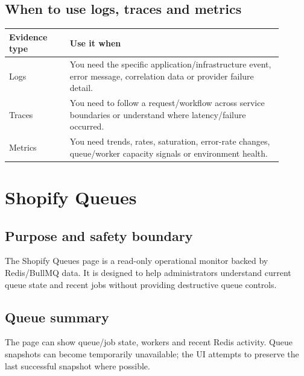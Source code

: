 
\section{When to use logs, traces and metrics}
\begin{longtable}{P{0.2\linewidth}P{0.7\linewidth}}
\toprule
\textbf{Evidence type} & \textbf{Use it when}\\
\midrule
\endhead
Logs & You need the specific application/infrastructure event, error message, correlation data or provider failure detail.\\
Traces & You need to follow a request/workflow across service boundaries or understand where latency/failure occurred.\\
Metrics & You need trends, rates, saturation, error-rate changes, queue/worker capacity signals or environment health.\\
\bottomrule
\end{longtable}

\chapter{Shopify Queues}

\section{Purpose and safety boundary}
The Shopify Queues page is a read-only operational monitor backed by Redis/BullMQ data. It is designed to help administrators understand current queue state and recent jobs without providing destructive queue controls.



\section{Queue summary}
The page can show queue/job state, workers and recent Redis activity. Queue snapshots can become temporarily unavailable; the UI attempts to preserve the last successful snapshot where possible.

